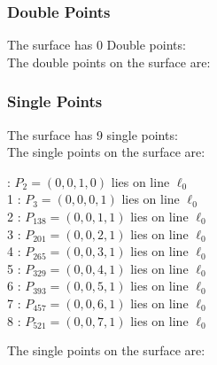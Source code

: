 \documentclass{article}
\begin{document}
{\subsubsection*{Double Points}
The surface has 0 Double points:\\
The double points on the surface are:\\
\begin{multicols}{2}
\noindent
\end{multicols}
\subsubsection*{Single Points}
The surface has 9 single points:\\
The single points on the surface are:\\
\begin{multicols}{2}
 : $P_{2}=( 0, 0, 1, 0 )$ lies on line $\ell_{0}$\\
1 : $P_{3}=( 0, 0, 0, 1 )$ lies on line $\ell_{0}$\\
2 : $P_{138}=( 0, 0, 1, 1 )$ lies on line $\ell_{0}$\\
3 : $P_{201}=( 0, 0, 2, 1 )$ lies on line $\ell_{0}$\\
4 : $P_{265}=( 0, 0, 3, 1 )$ lies on line $\ell_{0}$\\
5 : $P_{329}=( 0, 0, 4, 1 )$ lies on line $\ell_{0}$\\
6 : $P_{393}=( 0, 0, 5, 1 )$ lies on line $\ell_{0}$\\
7 : $P_{457}=( 0, 0, 6, 1 )$ lies on line $\ell_{0}$\\
8 : $P_{521}=( 0, 0, 7, 1 )$ lies on line $\ell_{0}$\\
\end{multicols}
The single points on the surface are:\\
}
\end{document}
